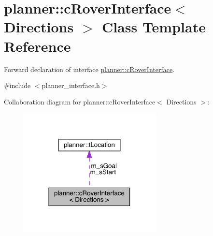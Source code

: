 \hypertarget{classplanner_1_1c_rover_interface}{}\section{planner\+:\+:c\+Rover\+Interface$<$ Directions $>$ Class Template Reference}
\label{classplanner_1_1c_rover_interface}


Forward declaration of interface \mbox{\hyperlink{classplanner_1_1c_rover_interface}{planner\+::c\+Rover\+Interface}}.  




{\ttfamily \#include $<$planner\+\_\+interface.\+h$>$}



Collaboration diagram for planner\+:\+:c\+Rover\+Interface$<$ Directions $>$\+:\nopagebreak
\begin{figure}[H]
\begin{center}
\leavevmode
\includegraphics[width=206pt]{classplanner_1_1c_rover_interface__coll__graph}
\end{center}
\end{figure}
